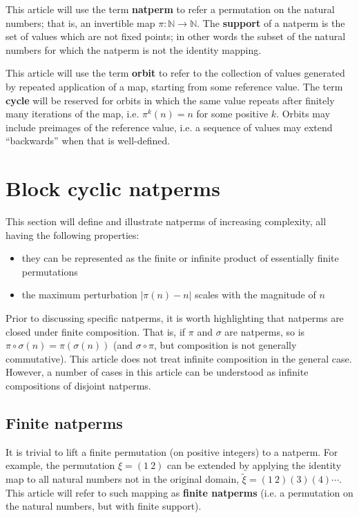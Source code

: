 \documentclass[12pt,reqno]{article}
\begin{document}
This article will use the term \textbf{natperm} to refer a permutation on the natural numbers; that is, an invertible map $\pi: \mathbb{N} \rightarrow \mathbb{N}$. The \textbf{support} of a natperm is the set of values which are not fixed points; in other words the subset of the natural numbers for which the natperm is not the identity mapping.

This article will use the term \textbf{orbit} to refer to the collection of values generated by repeated application of a map, starting from some reference value. The term \textbf{cycle} will be reserved for orbits in which the same value repeats after finitely many iterations of the map, i.e. $\pi^k(n) = n$ for some positive $k$. Orbits may include preimages of the reference value, i.e. a sequence of values may extend ``backwards'' when that is well-defined.

\section{Block cyclic natperms}

This section will define and illustrate natperms of increasing complexity, all having the following properties: \begin{itemize}
  \item they can be represented as the finite or infinite product of essentially finite permutations
  \item the maximum perturbation $|\pi(n) - n|$ scales with the magnitude of $n$
 \end{itemize}
 
Prior to discussing specific natperms, it is worth highlighting that natperms are closed under finite composition. That is, if $\pi$ and $\sigma$ are natperms, so is $\pi \circ \sigma(n) = \pi(\sigma(n))$ (and $\sigma \circ \pi$, but composition is not generally commutative). This article does not treat infinite composition in the general case. However, a number of cases in this article can be understood as infinite compositions of disjoint natperms.

\subsection{Finite natperms}

It is trivial to lift a finite permutation (on positive integers) to a natperm. For example, the permutation $\xi = (1 \ 2)$ can be extended by applying the identity map to all natural numbers not in the original domain, $\tilde{\xi} = (1 \ 2)(3)(4)\cdots$. This article will refer to such mapping as \textbf{finite natperms} (i.e. a permutation on the natural numbers, but with finite support).
\end{document}
